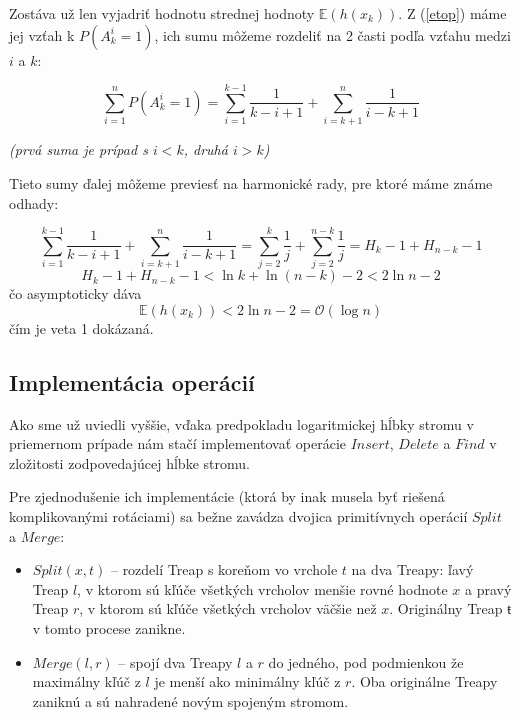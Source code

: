 \documentclass[a4paper, 12pt]{article}
\theoremstyle{definition}
\begin{document}
Zostáva už len vyjadriť hodnotu strednej hodnoty $\mathbb{E}(h(x_k))$. Z
(\ref{etop}) máme jej vzťah k $P(A^i_k = 1)$, ich sumu môžeme rozdeliť na 2 časti
podľa vzťahu medzi $i$ a $k$:

\begin{equation}
    \sum_{i=1}^n P(A^i_k = 1) = \sum_{i=1}^{k-1} \frac{1}{k-i+1} +
    \sum_{i=k+1}^{n} \frac{1}{i-k+1}
\end{equation}

\begin{center}
\emph{(prvá suma je prípad s $i < k$, druhá $i > k$)}
\end{center}

Tieto sumy ďalej môžeme previesť na harmonické rady, pre ktoré máme známe
odhady:

\begin{equation}
    \sum_{i=1}^{k-1} \frac{1}{k-i+1} + \sum_{i=k+1}^{n} \frac{1}{i-k+1}
    = \sum_{j=2}^{k} \frac{1}{j} + \sum_{j=2}^{n-k} \frac{1}{j}
    = H_k - 1 + H_{n-k} - 1
\end{equation}
\begin{equation}
    H_k - 1 + H_{n-k} - 1 < \ln k + \ln(n-k) - 2 < 2 \ln n - 2
\end{equation}
čo asymptoticky dáva
\begin{equation}
    \mathbb{E}(h(x_k)) < 2 \ln n - 2 = \mathcal{O}(\log n)
\end{equation}
čím je veta 1 dokázaná.

\subsection{Implementácia operácií}

Ako sme už uviedli vyššie, vďaka predpokladu logaritmickej hĺbky stromu v
priemernom prípade nám stačí implementovať operácie $Insert$, $Delete$ a $Find$
v zložitosti zodpovedajúcej hĺbke stromu. 

Pre zjednodušenie ich implementácie (ktorá by inak musela byť riešená
komplikovanými rotáciami) sa bežne zavádza dvojica primitívnych operácií
$Split$ a $Merge$:

\begin{itemize}
    \item $Split(x, t)$ -- rozdelí Treap s koreňom vo vrchole $t$ na dva
        Treapy: ľavý Treap $l$, v ktorom sú kľúče všetkých vrcholov menšie
        rovné hodnote $x$ a pravý Treap $r$, v ktorom sú kľúče všetkých
        vrcholov väčšie než $x$.  Originálny Treap $ŧ$ v tomto procese zanikne.
    \item $Merge(l, r)$ -- spojí dva Treapy $l$ a $r$ do jedného, pod
        podmienkou že maximálny kľúč z $l$ je menší ako minimálny kľúč z $r$.
        Oba originálne Treapy zaniknú a sú nahradené novým spojeným stromom.
\end{itemize}
\end{document}
